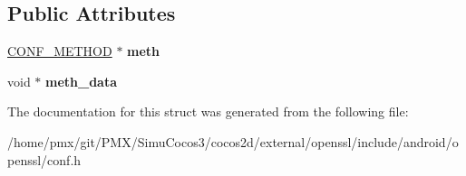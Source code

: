 \subsection*{Public Attributes}
\begin{DoxyCompactItemize}
\item 
\mbox{\label{structconf__st_ad74ccfaa7f1ba0ddf64df5d4ffe7ba6a}} 
\hyperlink{structconf__method__st}{C\+O\+N\+F\+\_\+\+M\+E\+T\+H\+OD} $\ast$ {\bfseries meth}
\item 
\mbox{\label{structconf__st_a154f25e931e6cbb2260b0bc23e5b9b41}} 
void $\ast$ {\bfseries meth\+\_\+data}
\end{DoxyCompactItemize}


The documentation for this struct was generated from the following file\+:\begin{DoxyCompactItemize}
\item 
/home/pmx/git/\+P\+M\+X/\+Simu\+Cocos3/cocos2d/external/openssl/include/android/openssl/conf.\+h\end{DoxyCompactItemize}
